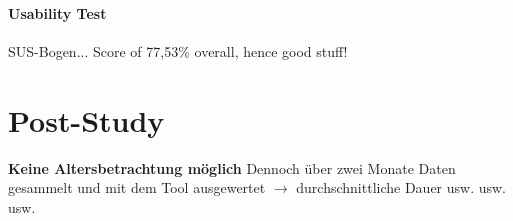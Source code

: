 %


\paragraph{Usability Test} \ac{SUS}-Bogen... Score of 77,53$\%$ overall, hence good stuff!


\section{Post-Study}
\label{evaluation_post}

\textbf{Keine Altersbetrachtung möglich} Dennoch über zwei Monate Daten gesammelt und mit dem Tool ausgewertet $\to$ durchschnittliche Dauer usw. usw. usw.